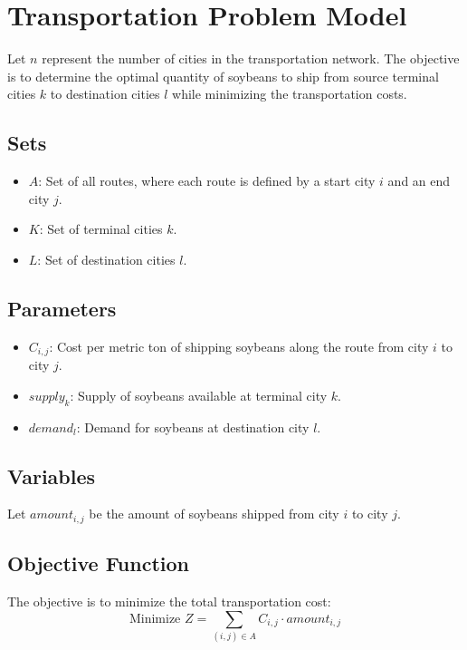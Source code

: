 \documentclass{article}
\begin{document}
\section*{Transportation Problem Model}

Let \( n \) represent the number of cities in the transportation network. The objective is to determine the optimal quantity of soybeans to ship from source terminal cities \( k \) to destination cities \( l \) while minimizing the transportation costs.

\subsection*{Sets}
\begin{itemize}
    \item \( A \): Set of all routes, where each route is defined by a start city \( i \) and an end city \( j \).
    \item \( K \): Set of terminal cities \( k \).
    \item \( L \): Set of destination cities \( l \).
\end{itemize}

\subsection*{Parameters}
\begin{itemize}
    \item \( C_{i,j} \): Cost per metric ton of shipping soybeans along the route from city \( i \) to city \( j \).
    \item \( supply_{k} \): Supply of soybeans available at terminal city \( k \).
    \item \( demand_{l} \): Demand for soybeans at destination city \( l \).
\end{itemize}

\subsection*{Variables}
Let \( amount_{i,j} \) be the amount of soybeans shipped from city \( i \) to city \( j \).

\subsection*{Objective Function}
The objective is to minimize the total transportation cost:
\[
\text{Minimize } Z = \sum_{(i,j) \in A} C_{i,j} \cdot amount_{i,j}
\]
\end{document}
